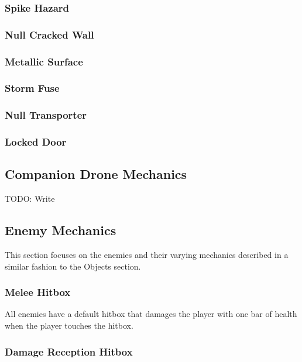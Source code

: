 \documentclass[12pt]{article}
\begin{document}
\subsubsection{Spike Hazard}

\subsubsection{Null Cracked Wall}

\subsubsection{Metallic Surface}

\subsubsection{Storm Fuse}

\subsubsection{Null Transporter}

\subsubsection{Locked Door}

\subsection{Companion Drone Mechanics}

TODO: Write

\subsection{Enemy Mechanics}

This section focuses on the enemies and their varying mechanics described in a similar fashion to the Objects section. 

\subsubsection{Melee Hitbox}

All enemies have a default hitbox that damages the player with one bar of health when the player touches the hitbox. 

\subsubsection{Damage Reception Hitbox}
\end{document}
